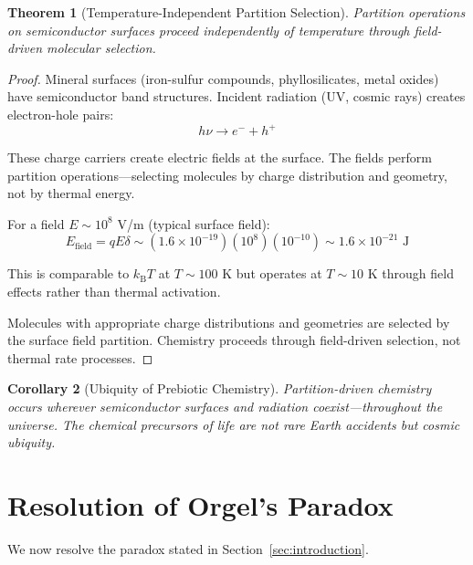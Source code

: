 \documentclass[twocolumn,10pt,a4paper]{article}
\newtheorem{theorem}{Theorem}[section]
\newtheorem{corollary}[theorem]{Corollary}
\theoremstyle{definition}
\theoremstyle{remark}
\newcommand{\kB}{k_{\mathrm{B}}}
\begin{document}
\begin{theorem}[Temperature-Independent Partition Selection]
\label{thm:temperature}
Partition operations on semiconductor surfaces proceed independently of temperature through field-driven molecular selection.
\end{theorem}

\begin{proof}
Mineral surfaces (iron-sulfur compounds, phyllosilicates, metal oxides) have semiconductor band structures. Incident radiation (UV, cosmic rays) creates electron-hole pairs:
\begin{equation}
    h\nu \to e^- + h^+
\end{equation}

These charge carriers create electric fields at the surface. The fields perform partition operations---selecting molecules by charge distribution and geometry, not by thermal energy.

For a field $E \sim 10^8$ V/m (typical surface field):
\begin{equation}
    E_{\text{field}} = qE\delta \sim (1.6 \times 10^{-19})(10^8)(10^{-10}) \sim 1.6 \times 10^{-21} \text{ J}
\end{equation}

This is comparable to $\kB T$ at $T \sim 100$ K but operates at $T \sim 10$ K through field effects rather than thermal activation.

Molecules with appropriate charge distributions and geometries are selected by the surface field partition. Chemistry proceeds through field-driven selection, not thermal rate processes.
\end{proof}

\begin{corollary}[Ubiquity of Prebiotic Chemistry]
\label{cor:ubiquity}
Partition-driven chemistry occurs wherever semiconductor surfaces and radiation coexist---throughout the universe. The chemical precursors of life are not rare Earth accidents but cosmic ubiquity.
\end{corollary}

\section{Resolution of Orgel's Paradox}
\label{sec:resolution}

We now resolve the paradox stated in Section~\ref{sec:introduction}.
\end{document}
